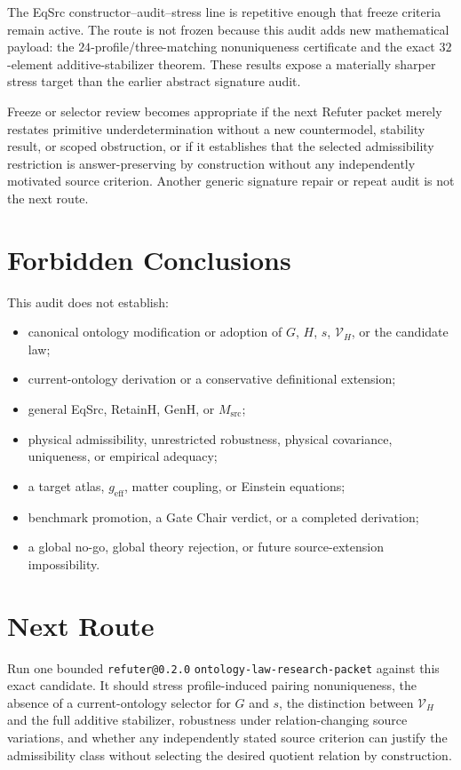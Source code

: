 \documentclass[11pt]{article}
\newcommand{\Vary}{\mathcal V_H}
\begin{document}
The EqSrc constructor--audit--stress line is repetitive enough that freeze
criteria remain active.  The route is not frozen because this audit adds new
mathematical payload: the \(24\)-profile/three-matching nonuniqueness
certificate and the exact \(32\)-element additive-stabilizer theorem.  These
results expose a materially sharper stress target than the earlier abstract
signature audit.

Freeze or selector review becomes appropriate if the next Refuter packet
merely restates primitive underdetermination without a new countermodel,
stability result, or scoped obstruction, or if it establishes that the
selected admissibility restriction is answer-preserving by construction
without any independently motivated source criterion.  Another generic
signature repair or repeat audit is not the next route.

\section{Forbidden Conclusions}

This audit does not establish:
\begin{itemize}[leftmargin=*]
  \item canonical ontology modification or adoption of \(G\), \(H\), \(s\),
  \(\Vary\), or the candidate law;
  \item current-ontology derivation or a conservative definitional extension;
  \item general EqSrc, RetainH, GenH, or \(M_{\mathrm{src}}\);
  \item physical admissibility, unrestricted robustness, physical covariance,
  uniqueness, or empirical adequacy;
  \item a target atlas, \(g_{\mathrm{eff}}\), matter coupling, or Einstein
  equations;
  \item benchmark promotion, a Gate Chair verdict, or a completed derivation;
  \item a global no-go, global theory rejection, or future source-extension
  impossibility.
\end{itemize}

\section{Next Route}

Run one bounded \texttt{refuter@0.2.0}
\texttt{ontology-law-research-packet} against this exact candidate.  It should
stress profile-induced pairing nonuniqueness, the absence of a
current-ontology selector for \(G\) and \(s\), the distinction between
\(\Vary\) and the full additive stabilizer, robustness under
relation-changing source variations, and whether any independently stated
source criterion can justify the admissibility class without selecting the
desired quotient relation by construction.
\end{document}
